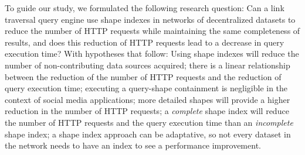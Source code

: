 To guide our study, we formulated the following research question:
Can a link traversal query engine use shape indexes in networks of decentralized datasets to reduce the number of HTTP requests while maintaining the same completeness of results, and does this reduction of HTTP requests lead to a decrease in query execution time?
With hypotheses that follow:
Using shape indexes will reduce the number of non-contributing data sources acquired;
there is a linear relationship between the reduction of the number of HTTP requests and the reduction of query execution time;
executing a query-shape containment is negligible in the context of social media applications; 
more detailed shapes will provide a higher reduction in the number of HTTP requests;
a \emph{complete} shape index will reduce the number of HTTP requests and the query execution time than an \emph{incomplete} shape index;
a shape index approach can be adaptative, so not every dataset in the network needs to have an index to see a performance improvement.
\iffalse
Can our method reduce the ratio of non-contributing data source dereferenced?
How does the diminution of HTTP request affect the query execution time?
How does the level of detail of the shapes impact the performances?
What is the difference in performance between a \emph{complete} and an \emph{incomplete} shape index?
How does the ratio of subdomains containing an index influence global performances?
How does the fragmentation of the subdomain impact the performance?
How does the quantity of non-query contributing resources impact the performances?
What is the ideal query execution time if we only dereferenced contributing data sources?
\fi